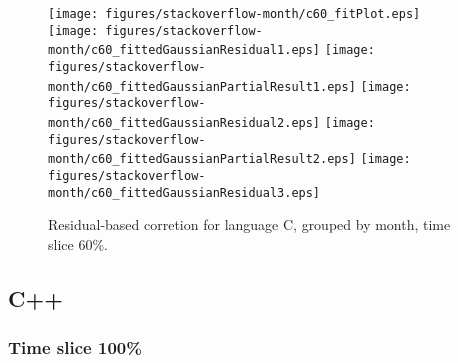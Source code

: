 \begin{figure}[t]
\centering
{}
{\texttt{[image: figures/stackoverflow-month/c60\_fitPlot.eps]}}
{\texttt{[image: figures/stackoverflow-month/c60\_fittedGaussianResidual1.eps]}}
{\texttt{[image: figures/stackoverflow-month/c60\_fittedGaussianPartialResult1.eps]}}
{\texttt{[image: figures/stackoverflow-month/c60\_fittedGaussianResidual2.eps]}}
{\texttt{[image: figures/stackoverflow-month/c60\_fittedGaussianPartialResult2.eps]}}
{\texttt{[image: figures/stackoverflow-month/c60\_fittedGaussianResidual3.eps]}}
\caption{Residual-based corretion for language C, grouped by month, time slice 60\%.}
\end{figure}


\FloatBarrier


\subsection{C++}

\subsubsection{Time slice 100\%}

